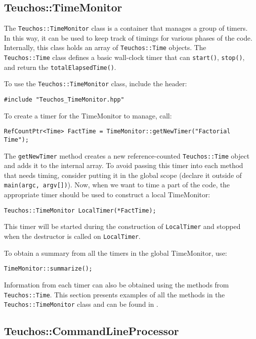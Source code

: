 
\subsection{Teuchos::TimeMonitor}
\label{sec:teuchos:TimeMonitor}

The \verb!Teuchos::TimeMonitor! class is a container that manages a
group of timers.  In this way, it can be used to keep track of timings
for various phases of the code.  Internally, this class holds an array 
of \verb!Teuchos::Time! objects.  The 
\verb!Teuchos::Time! class defines a basic wall-clock timer that can 
\verb!start()!, \verb!stop()!, and return the \verb!totalElapsedTime()!.

To use the \verb!Teuchos::TimeMonitor! class, include the header:
{\small 
\begin{verbatim}
#include "Teuchos_TimeMonitor.hpp"
\end{verbatim}}
To create a timer for the TimeMonitor to manage, call:
{\small 
\begin{verbatim}
RefCountPtr<Time> FactTime = TimeMonitor::getNewTimer("Factorial Time");
\end{verbatim}}
\noindent The {\tt getNewTimer} method creates a new reference-counted
{\tt Teuchos::Time} object and adds it to the internal array.  To avoid
passing this timer into each method that needs timing, consider putting it in the
global scope (declare it outside of {\tt main(argc, argv[])}).  Now, when 
we want to time a part of the code, the appropriate timer should be used to 
construct a local TimeMonitor:
{\small
\begin{verbatim}
Teuchos::TimeMonitor LocalTimer(*FactTime);
\end{verbatim}}
\noindent This timer will be started during the construction of {\tt LocalTimer}
and stopped when the destructor is called on {\tt LocalTimer}.

To obtain a summary from all the timers in the global TimeMonitor, use:
{\small
\begin{verbatim}
TimeMonitor::summarize();
\end{verbatim}}
\noindent Information from each timer can also be obtained using 
the methods from {\tt Teuchos::Time}.  
This section presents examples of all the 
methods in the {\tt Teuchos::TimeMonitor} class and can be found in
.  


\subsection{Teuchos::CommandLineProcessor}
\label{sec:teuchos:CLP}

